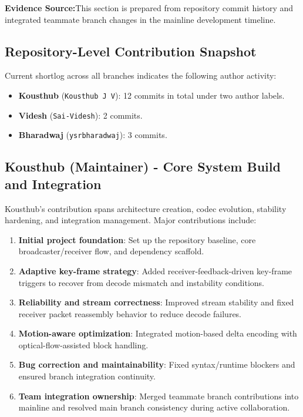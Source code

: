 \documentclass[12pt,a4paper]{article}
\begin{document}
\begin{tcolorbox}[colback=lightgold, colframe=iiitkgold, arc=5pt, boxrule=1pt]
\textbf{Evidence Source:}\enspace This section is prepared from repository commit history and integrated teammate branch changes in the mainline development timeline.
\end{tcolorbox}

\subsection{Repository-Level Contribution Snapshot}
Current shortlog across all branches indicates the following author activity:
\begin{itemize}[leftmargin=*, itemsep=4pt]
  \item \textbf{Kousthub} (\texttt{Kousthub J V}): 12 commits in total under two author labels.
  \item \textbf{Videsh} (\texttt{Sai-Videsh}): 2 commits.
  \item \textbf{Bharadwaj} (\texttt{ysrbharadwaj}): 3 commits.
\end{itemize}



\subsection{Kousthub (Maintainer) - Core System Build and Integration}
Kousthub's contribution spans architecture creation, codec evolution, stability hardening, and integration management. Major contributions include:
\begin{enumerate}[label=\textbf{\arabic*.}, itemsep=6pt]
  \item \textbf{Initial project foundation}: Set up the repository baseline, core broadcaster/receiver flow, and dependency scaffold.
  \item \textbf{Adaptive key-frame strategy}: Added receiver-feedback-driven key-frame triggers to recover from decode mismatch and instability conditions.
  \item \textbf{Reliability and stream correctness}: Improved stream stability and fixed receiver packet reassembly behavior to reduce decode failures.
  \item \textbf{Motion-aware optimization}: Integrated motion-based delta encoding with optical-flow-assisted block handling.
  \item \textbf{Bug correction and maintainability}: Fixed syntax/runtime blockers and ensured branch integration continuity.
  \item \textbf{Team integration ownership}: Merged teammate branch contributions into mainline and resolved main branch consistency during active collaboration.
\end{enumerate}
\end{document}
